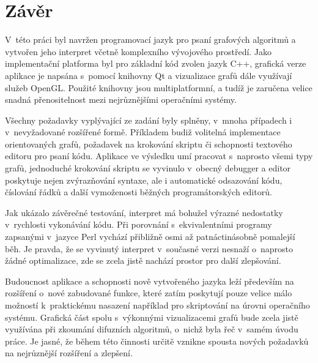 \documentclass[11pt,twoside,a4paper]{book}
\begin{document}



\chapter{Závěr}


V~této práci byl navržen programovací jazyk pro psaní grafových algoritmů a vytvořen jeho interpret včetně komplexního vývojového prostředí. Jako implementační platforma byl pro základní kód zvolen jazyk C++, grafická verze aplikace je napsána s~pomocí knihovny Qt a vizualizace grafů dále využívají služeb OpenGL. Použité knihovny jsou multiplatformní, a tudíž je zaručena velice snadná přenositelnost mezi nejrůznějšími operačními systémy.

Všechny požadavky vyplývající ze zadání byly splněny, v~mnoha případech i v~nevyžadované rozšířené formě. Příkladem budiž volitelná implementace orientovaných grafů, požadavek na krokování skriptu či schopnosti textového editoru pro psaní kódu. Aplikace ve výsledku umí pracovat s~naprosto všemi typy grafů, jednoduché krokování skriptu se vyvinulo v~obecný debugger a editor poskytuje nejen zvýrazňování syntaxe, ale i automatické odsazování kódu, číslování řádků a další vymoženosti běžných programátorských editorů.

Jak ukázalo závěrečné testování, interpret má bohužel výrazné nedostatky v~rychlosti vykonávání kódu. Při porovnání s~ekvivalentními programy zapsanými v~jazyce Perl vychází přibližně osmi až patnáctinásobně pomalejší běh. Je pravda, že se vyvinutý interpret v~sou\-čas\-né verzi nesnaží o~naprosto žádné optimalizace, zde se zcela jistě nachází prostor pro další zlepšování.

Budoucnost aplikace a schopnosti nově vytvořeného jazyka leží především na rozšíření o~nové zabudované funkce, které zatím poskytují pouze velice málo možností k~praktickému nasazení například pro skriptování na úrovni operačního systému. Grafická část spolu s~výkonnými vizualizacemi grafů bude zcela jistě využívána při zkoumání difuzních algoritmů, o~nichž byla řeč v~samém úvodu práce. Je jasné, že během této činnosti určitě vznikne spousta nových požadavků na nejrůznější rozšíření a zlepšení.
\end{document}
